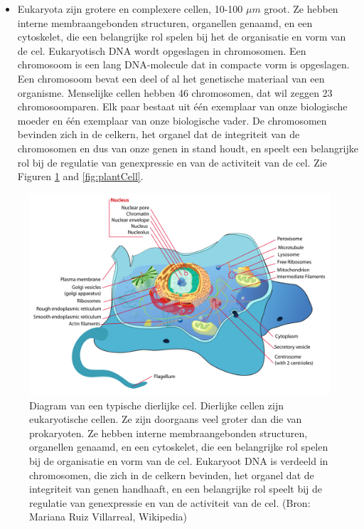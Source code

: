 \documentclass[
  11pt,
]{book}
\providecommand{\tightlist}{%
  \setlength{\itemsep}{0pt}\setlength{\parskip}{0pt}}
\begin{document}
\begin{itemize}
\tightlist
\item
  Eukaryota zijn grotere en complexere cellen, 10-100 \(\mu m\) groot. Ze hebben interne membraangebonden structuren, organellen genaamd, en een cytoskelet, die een belangrijke rol spelen bij het de organisatie en vorm van de cel. Eukaryotisch DNA wordt opgeslagen in chromosomen. Een chromosoom is een lang DNA-molecule dat in compacte vorm is opgeslagen. Een chromosoom bevat een deel of al het genetische materiaal van een organisme. Menselijke cellen hebben 46 chromosomen, dat wil zeggen 23 chromosoomparen. Elk paar bestaat uit één exemplaar van onze biologische moeder en één exemplaar van onze biologische vader. De chromosomen bevinden zich in de celkern, het organel dat de integriteit van de chromosomen en dus van onze genen in stand houdt, en speelt een belangrijke rol bij de regulatie van genexpressie en van de activiteit van de cel. Zie Figuren \ref{fig:animalCell} and \ref{fig:plantCell}.
\end{itemize}

\begin{figure}

{\centering \includegraphics[width=0.5\linewidth]{./figs/animalCell} 

}

\caption{Diagram van een typische dierlijke cel. Dierlijke cellen zijn eukaryotische cellen. Ze zijn doorgaans veel groter dan die van prokaryoten. Ze hebben interne membraangebonden structuren, organellen genaamd, en een cytoskelet, die een belangrijke rol spelen bij de organisatie en vorm van de cel. Eukaryoot DNA is verdeeld in chromosomen, die zich in de celkern bevinden, het organel dat de integriteit van genen handhaaft, en een belangrijke rol speelt bij de regulatie van genexpressie en van de activiteit van de cel. (Bron:  Mariana Ruiz Villarreal, Wikipedia)}\label{fig:animalCell}
\end{figure}
\end{document}
